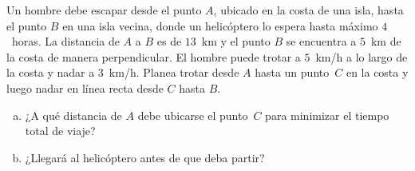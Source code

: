 \begin{prob}
Un hombre debe escapar desde el punto $A$, ubicado en la costa de una isla, hasta
el punto $B$ en una isla vecina, donde un helicóptero lo espera hasta máximo
$4$~horas. La distancia de $A$ a $B$ es de $13$~km y el punto $B$ se encuentra
a $5$~km de la costa de manera perpendicular. El hombre puede trotar a $5$~km/h
a lo largo de la costa y nadar a $3$~km/h. Planea trotar desde $A$ hasta un
punto~$C$ en la costa y luego nadar en línea recta desde $C$ hasta $B$.

\begin{enumerate}[(a)]
  \item ¿A qué distancia de $A$ debe ubicarse el punto~$C$ para minimizar el
        tiempo total de viaje?
  \item ¿Llegará al helicóptero antes de que deba partir?
\end{enumerate}

\begin{figure}[!htbp]
\centering
{}
\end{figure}
\end{prob}

